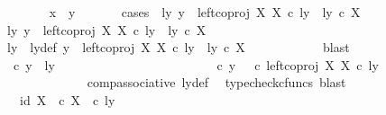 \begin{isabellebody}
\isanewline
\ \ \ \ \ \ \isamarkupfalse%
\ {\isachardoublequoteopen}x\ {\isacharequal}{\kern0pt}\ y{\isachardoublequoteclose}\isanewline
\ \ \ \ \ \ \isamarkupfalse%
{\isacharparenleft}{\kern0pt}cases\ {\isachardoublequoteopen}{\isasymexists}\ ly{\isachardot}{\kern0pt}\ y\ {\isacharequal}{\kern0pt}\ left{\isacharunderscore}{\kern0pt}coproj\ X\ X\ {\isasymcirc}\isactrlsub c\ ly\ {\isasymand}\ ly\ {\isasymin}\isactrlsub c\ X{\isachardoublequoteclose}{\isacharparenright}{\kern0pt}\isanewline
\ \ \ \ \ \ \ \ \isamarkupfalse%
\ {\isachardoublequoteopen}{\isasymexists}ly{\isachardot}{\kern0pt}\ y\ {\isacharequal}{\kern0pt}\ left{\isacharunderscore}{\kern0pt}coproj\ X\ X\ {\isasymcirc}\isactrlsub c\ ly\ {\isasymand}\ ly\ {\isasymin}\isactrlsub c\ X{\isachardoublequoteclose}\isanewline
\ \ \ \ \ \ \ \ \isamarkupfalse%
\ \isamarkupfalse%
\ ly\ \ ly{\isacharunderscore}{\kern0pt}def{\isacharcolon}{\kern0pt}\ {\isachardoublequoteopen}y\ {\isacharequal}{\kern0pt}\ left{\isacharunderscore}{\kern0pt}coproj\ X\ X\ {\isasymcirc}\isactrlsub c\ ly\ {\isasymand}\ ly\ {\isasymin}\isactrlsub c\ X{\isachardoublequoteclose}\isanewline
\ \ \ \ \ \ \ \ \ \ \isamarkupfalse%
\ blast\isanewline
\ \ \ \ \ \ \ \ \isamarkupfalse%
\ {\isachardoublequoteopen}{\isasymrho}\ {\isasymcirc}\isactrlsub c\ y\ {\isacharequal}{\kern0pt}\ {\isasymlangle}ly{\isacharcomma}{\kern0pt}\ {\isasymt}{\isasymrangle}{\isachardoublequoteclose}\isanewline
\ \ \ \ \ \ \ \ \isamarkupfalse%
\ {\isacharminus}{\kern0pt}\ \isanewline
\ \ \ \ \ \ \ \ \ \ \isamarkupfalse%
\ {\isachardoublequoteopen}{\isasymrho}\ {\isasymcirc}\isactrlsub c\ y\ {\isacharequal}{\kern0pt}\ {\isacharparenleft}{\kern0pt}{\isasymrho}\ {\isasymcirc}\isactrlsub c\ left{\isacharunderscore}{\kern0pt}coproj\ X\ X{\isacharparenright}{\kern0pt}\ {\isasymcirc}\isactrlsub c\ ly{\isachardoublequoteclose}\isanewline
\ \ \ \ \ \ \ \ \ \ \ \ \isamarkupfalse%
\ comp{\isacharunderscore}{\kern0pt}associative{}\ ly{\isacharunderscore}{\kern0pt}def\ \isamarkupfalse%
\ {\isacharparenleft}{\kern0pt}typecheck{\isacharunderscore}{\kern0pt}cfuncs{\isacharcomma}{\kern0pt}\ blast{\isacharparenright}{\kern0pt}\isanewline
\ \ \ \ \ \ \ \ \ \ \isamarkupfalse%
\ \isamarkupfalse%
\ {\isachardoublequoteopen}{\isachardot}{\kern0pt}{\isachardot}{\kern0pt}{\isachardot}{\kern0pt}\ {\isacharequal}{\kern0pt}\ {\isasymlangle}id\ X{\isacharcomma}{\kern0pt}\ {\isasymt}\ {\isasymcirc}\isactrlsub c\ {\isasymbeta}\isactrlbsub X\isactrlesub {\isasymrangle}\ \ {\isasymcirc}\isactrlsub c\ ly{\isachardoublequoteclose}\isanewline

\end{isabellebody}

